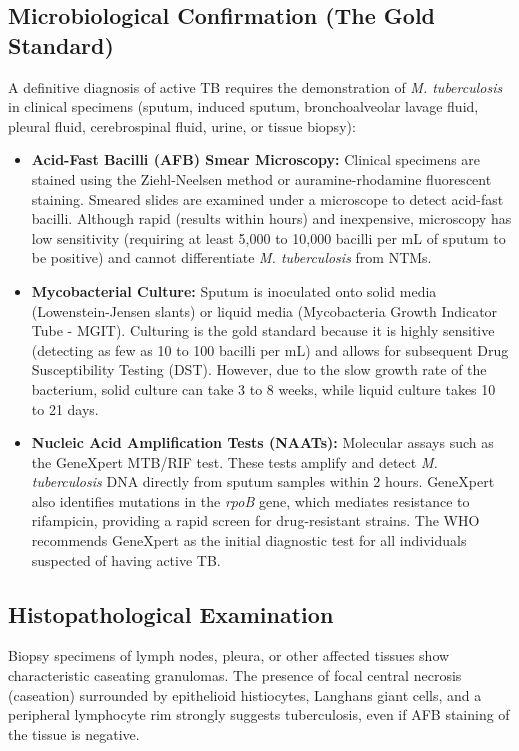 \subsection*{Microbiological Confirmation (The Gold Standard)}
A definitive diagnosis of active TB requires the demonstration of \textit{M. tuberculosis} in clinical specimens (sputum, induced sputum, bronchoalveolar lavage fluid, pleural fluid, cerebrospinal fluid, urine, or tissue biopsy):
\begin{itemize}
    \item \textbf{Acid-Fast Bacilli (AFB) Smear Microscopy:} Clinical specimens are stained using the Ziehl-Neelsen method or auramine-rhodamine fluorescent staining. Smeared slides are examined under a microscope to detect acid-fast bacilli. Although rapid (results within hours) and inexpensive, microscopy has low sensitivity (requiring at least 5,000 to 10,000 bacilli per mL of sputum to be positive) and cannot differentiate \textit{M. tuberculosis} from NTMs.
    \item \textbf{Mycobacterial Culture:} Sputum is inoculated onto solid media (Lowenstein-Jensen slants) or liquid media (Mycobacteria Growth Indicator Tube - MGIT). Culturing is the gold standard because it is highly sensitive (detecting as few as 10 to 100 bacilli per mL) and allows for subsequent Drug Susceptibility Testing (DST). However, due to the slow growth rate of the bacterium, solid culture can take 3 to 8 weeks, while liquid culture takes 10 to 21 days.
    \item \textbf{Nucleic Acid Amplification Tests (NAATs):} Molecular assays such as the GeneXpert MTB/RIF test. These tests amplify and detect \textit{M. tuberculosis} DNA directly from sputum samples within 2 hours. GeneXpert also identifies mutations in the \textit{rpoB} gene, which mediates resistance to rifampicin, providing a rapid screen for drug-resistant strains. The WHO recommends GeneXpert as the initial diagnostic test for all individuals suspected of having active TB.
\end{itemize}

\subsection*{Histopathological Examination}
Biopsy specimens of lymph nodes, pleura, or other affected tissues show characteristic caseating granulomas. The presence of focal central necrosis (caseation) surrounded by epithelioid histiocytes, Langhans giant cells, and a peripheral lymphocyte rim strongly suggests tuberculosis, even if AFB staining of the tissue is negative.

